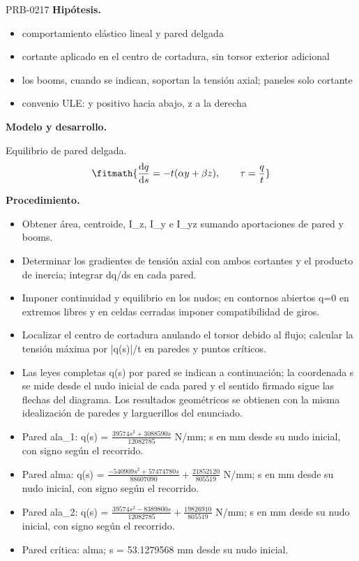 \begin{studiumworked}{PRB-0217}
\textbf{Hipótesis.}\begin{itemize}\item comportamiento elástico lineal y pared delgada
\item cortante aplicado en el centro de cortadura, sin torsor exterior adicional
\item los booms, cuando se indican, soportan la tensión axial; paneles solo cortante
\item convenio ULE: y positivo hacia abajo, z a la derecha\end{itemize}

\textbf{Modelo y desarrollo.}

Equilibrio de pared delgada.\[\fitmath{\frac{\mathrm{d}q}{\mathrm{d}s}=-t(\alpha y+\beta z),\qquad \tau=\frac{q}{t}}\]

\textbf{Procedimiento.}\begin{itemize}\item Obtener área, centroide, I\_z, I\_y e I\_yz sumando aportaciones de pared y booms.
\item Determinar los gradientes de tensión axial con ambos cortantes y el producto de inercia; integrar dq/ds en cada pared.
\item Imponer continuidad y equilibrio en los nudos; en contornos abiertos q=0 en extremos libres y en celdas cerradas imponer compatibilidad de giros.
\item Localizar el centro de cortadura anulando el torsor debido al flujo; calcular la tensión máxima por |q(s)|/t en paredes y puntos críticos.
\item Las leyes completas q(s) por pared se indican a continuación; la coordenada s se mide desde el nudo inicial de cada pared y el sentido firmado sigue las flechas del diagrama. Los resultados geométricos se obtienen con la misma idealización de paredes y larguerillos del enunciado.
\item Pared ala\_1: q(s) = $\frac{39574 s^{2} + 3088590 s}{12082785}$ N/mm; s en mm desde su nudo inicial, con signo según el recorrido.
\item Pared alma: q(s) = $\frac{- 540909 s^{2} + 57474780 s}{88607090} + \frac{21852120}{805519}$ N/mm; s en mm desde su nudo inicial, con signo según el recorrido.
\item Pared ala\_2: q(s) = $\frac{39574 s^{2} - 8389800 s}{12082785} + \frac{19826910}{805519}$ N/mm; s en mm desde su nudo inicial, con signo según el recorrido.
\item Pared crítica: alma; s = 53.1279568 mm desde su nudo inicial.\end{itemize}


\end{studiumworked}
